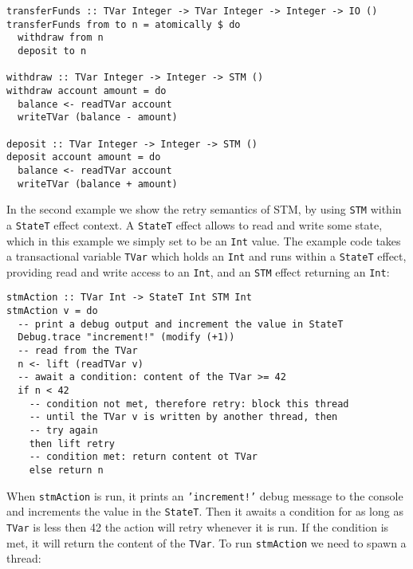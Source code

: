 \begin{footnotesize}
\begin{verbatim}
transferFunds :: TVar Integer -> TVar Integer -> Integer -> IO ()
transferFunds from to n = atomically $ do
  withdraw from n
  deposit to n
  
withdraw :: TVar Integer -> Integer -> STM ()
withdraw account amount = do
  balance <- readTVar account
  writeTVar (balance - amount)
  
deposit :: TVar Integer -> Integer -> STM ()
deposit account amount = do
  balance <- readTVar account
  writeTVar (balance + amount)
\end{verbatim}
\end{footnotesize}

In the second example we show the retry semantics of STM, by using \texttt{STM} within a \texttt{StateT} effect context. A \texttt{StateT} effect allows to read and write some state, which in this example we simply set to be an \texttt{Int} value. The example code takes a transactional variable \texttt{TVar} which holds an \texttt{Int} and runs within a \texttt{StateT} effect, providing read and write access to an \texttt{Int}, and an \texttt{STM} effect returning an \texttt{Int}: \\ %

\begin{footnotesize}
\begin{verbatim}
stmAction :: TVar Int -> StateT Int STM Int 
stmAction v = do
  -- print a debug output and increment the value in StateT 
  Debug.trace "increment!" (modify (+1))
  -- read from the TVar
  n <- lift (readTVar v)
  -- await a condition: content of the TVar >= 42
  if n < 42
    -- condition not met, therefore retry: block this thread
    -- until the TVar v is written by another thread, then
    -- try again
    then lift retry
    -- condition met: return content ot TVar
    else return n
\end{verbatim}
\end{footnotesize}

\medskip %

When \texttt{stmAction} is run, it prints an \texttt{'increment!'} debug message to the console and increments the value in the \texttt{StateT}. Then it awaits a condition for as long as \texttt{TVar} is less then 42 the action will retry whenever it is run. If the condition is met, it will return the content of the \texttt{TVar}. To run \texttt{stmAction} we need to spawn a thread: \\ %

